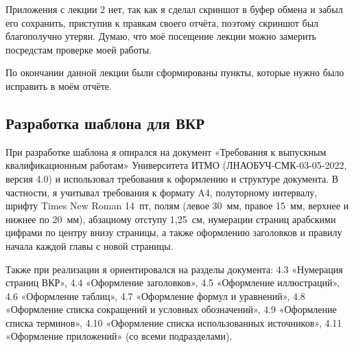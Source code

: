 Приложения с лекции 2 нет, так как я сделал скриншот в буфер обмена и забыл его сохранить, приступив к правкам своего отчёта, поэтому скриншот был благополучно утерян. 
Думаю, что моё посещение лекции можно замерить посредстам проверке моей работы.

По окончании данной лекции были сформированы пункты, которые нужно было исправить в моём отчёте.

\subsection{Разработка шаблона для ВКР}

При разработке шаблона я опирался на документ «Требования к выпускным квалификационным работам» Университета ИТМО (ЛНАОБУЧ-СМК-03-05-2022, версия 4.0) 
и использовал требования к оформлению и структуре документа.
В частности, я учитывал требования к формату A4, полуторному интервалу, шрифту Times New Roman 14~пт, 
полям (левое 30~мм, правое 15~мм, верхнее и нижнее по 20~мм), абзацному отступу 1{,}25~см, 
нумерации страниц арабскими цифрами по центру внизу страницы, а также оформлению заголовков и правилу начала каждой главы с новой страницы.

Также при реализации я ориентировался на разделы документа: 4.3 «Нумерация страниц ВКР», 4.4 «Оформление заголовков», 4.5 «Оформление иллюстраций», 4.6 «Оформление таблиц», 4.7 «Оформление формул и уравнений», 4.8 «Оформление списка сокращений и условных обозначений», 4.9 «Оформление списка терминов», 4.10 «Оформление списка использованных источников», 4.11 «Оформление приложений» (со всеми подразделами).

